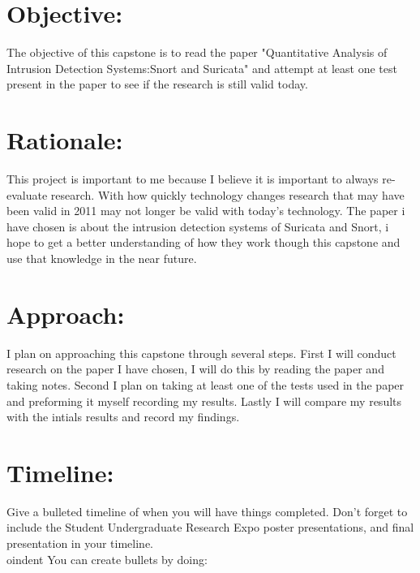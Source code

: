 \documentclass{article}
\begin{document}
    \begin{normalsize}
    
    	\section{Objective:}
        
        The objective of this capstone is to read the paper "Quantitative Analysis of Intrusion Detection Systems:Snort and Suricata" and attempt at least one test present in the paper to see if the research is still valid today.    \\
      
		\section{Rationale:}
        
       This project is important to me because I believe it is important to always re-evaluate research. With how quickly technology changes research that may have been valid  in 2011 may not longer be valid with today's technology.  The paper i have chosen is about the intrusion detection systems of Suricata and Snort, i hope to get a better understanding of how they work though this capstone and use that knowledge in the near future.
        
	   	\section{Approach:}
        
      I plan on approaching this capstone through several steps.  First I will conduct research on the paper I have chosen, I will do this by reading the paper and taking notes. Second I plan on taking at least one of the tests used in the paper and preforming it myself recording my results.  Lastly I will compare my results with the intials results and record my findings.
        
    	\section{Timeline:}
        
        Give a bulleted timeline of when you will have things completed. Don't forget to include the Student Undergraduate Research Expo poster presentations, and final presentation in your timeline. 
        \\
        
        
oindent You can create bullets by doing:
        

\end{normalsize}
\end{document}

